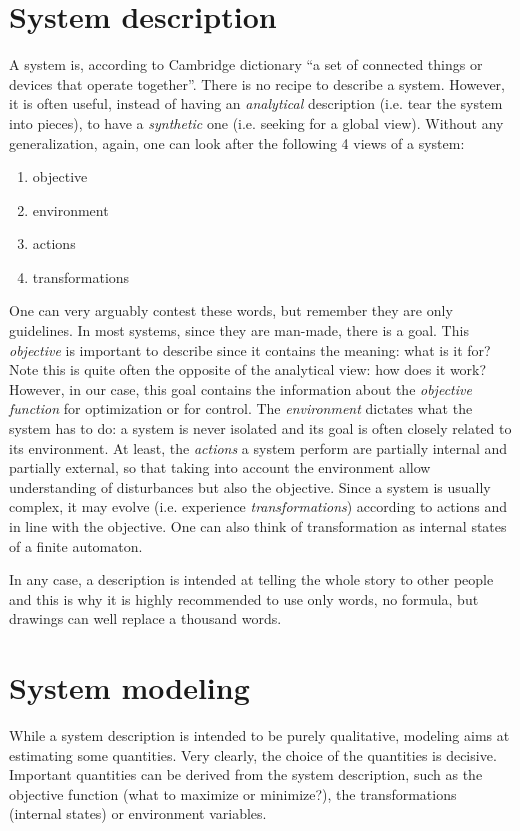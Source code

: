 \section{System description}\label{description.sec}
A system is, according to Cambridge dictionary ``a set of connected things or devices that operate together''. There is no recipe to describe a system. However, it is often useful, instead of having an \emph{analytical} description (i.e. tear the system into pieces), to have a \emph{synthetic} one (i.e. seeking for a global view). Without any generalization, again, one can look after the following 4 views of a system:
\begin{enumerate}
	\item objective
	\item environment
	\item actions
	\item transformations
\end{enumerate}
One can very arguably contest these words, but remember they are only guidelines. In most systems, since they are man-made, there is a goal. This \emph{objective} is important to describe since it contains the meaning: what is it for? Note this is quite often the opposite of the analytical view: how does it work? However, in our case, this goal contains the information about the \emph{objective function} for optimization or for control. The \emph{environment} dictates what the system has to do: a system is never isolated and its goal is often closely related to its environment. At least, the \emph{actions} a system perform are partially internal and partially external, so that taking into account the environment allow understanding of disturbances but also the objective. Since a system is usually complex, it may evolve (i.e. experience \emph{transformations}) according to actions and in line with the objective. One can also think of transformation as internal states of a finite automaton.

In any case, a description is intended at telling the whole story to other people and this is why it is highly recommended to use only words, no formula, but drawings can well replace a thousand words.

\section{System modeling}
While a system description is intended to be purely qualitative, modeling aims at estimating some quantities. Very clearly, the choice of the quantities is decisive. Important quantities can be derived from the system description, such as the objective function (what to maximize or minimize?), the transformations (internal states) or environment variables.

